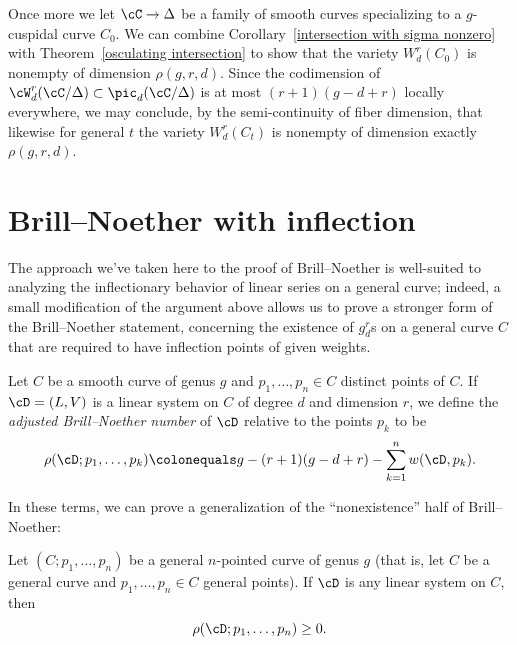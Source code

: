 Once more we let $\cC \to \Delta$ be a family of smooth
curves specializing to a $g$-cuspidal curve $C_0$. We can 
combine
Corollary~\ref{intersection with sigma nonzero} with
Theorem~\ref{osculating intersection} to 
show
that the variety $W^r_d(C_0)$
is nonempty of dimension $\rho(g,r,d)$. Since the codimension of
$\cW^r_d(\cC/\Delta) \subset \pic_d(\cC/\Delta)$ is at most $(r+1)(g-d+r)$
locally everywhere, we may conclude, by the semi-continuity of fiber dimension, that likewise for general $t$
the variety $W^r_d(C_t)$ is nonempty of dimension exactly $\rho(g,r,d)$.

\section{Brill--Noether with inflection}

The approach we've taken here to the proof of Brill--Noether is
%
%
%
well-suited to analyzing the inflectionary behavior of linear series on a
general curve; indeed, a small modification of the argument above allows
us to prove a stronger form of the Brill--Noether statement, concerning
the existence of $g^r_d$s on a general curve $C$ that are required to
 have inflection points of given weights.

\begin{definition}
Let $C$ be a smooth curve of genus $g$ and $p_1,\dots,p_n \in C$ distinct
points of $C$. If $\cD = (L,V)$ is a linear system on $C$ of degree $d$
and dimension $r$, we define the \emph{adjusted Brill--Noether number}
%
of $\cD$ relative to the points $p_k$ to be
$$
\rho(\cD; p_1,\dots,p_k) \colonequals  g - (r+1)(g-d+r) - \sum_{k=1}^n
w(\cD,p_k).
$$
\end{definition}

In these terms, we can prove 
a
generalization of the
``nonexistence'' half of Brill--Noether:

\begin{theorem}\label{Brill--Noether with inflection}
Let $(C;p_1,\dots,p_n)$ be a general $n$-pointed curve of genus $g$
(that is, let $C$ be a general curve and $p_1,\dots,p_n \in C$ general
points). If $\cD$ is any linear system on $C$, then
$$
\rho(\cD; p_1,\dots,p_n) \geq 0.
$$
\end{theorem}

